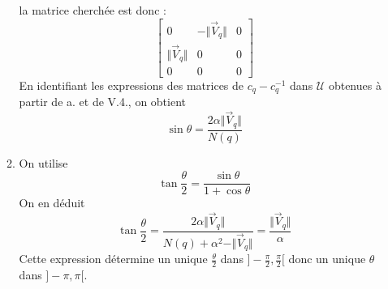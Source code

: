 \begin{enumerate}
\begin{enumerate}
\begin{displaymath}
\end{displaymath}
la matrice cherchée est donc :
\begin{displaymath}
 \begin{bmatrix}
  0 &   - \Vert \overrightarrow V_q \Vert & 0 \\
\Vert \overrightarrow V_q \Vert & 0 & 0 \\
0 & 0 & 0
 \end{bmatrix}
\end{displaymath}
En identifiant les expressions des matrices de $c_q - c_q^{-1}$ dans $\mathcal U$ obtenues à partir de a. et de V.4., on obtient
\begin{displaymath}
 \sin \theta = \dfrac{2\alpha \Vert \overrightarrow V_q \Vert}{N(q)}
\end{displaymath}
\item On utilise
\begin{displaymath}
 \tan \frac{\theta}{2} = \dfrac{\sin \theta}{1 + \cos \theta}
\end{displaymath}
On en déduit
\begin{displaymath}
  \tan \frac{\theta}{2} = \dfrac{2\alpha \Vert \overrightarrow V_q \Vert}{N(q)+\alpha^2-\Vert \overrightarrow V_q \Vert} 
= \dfrac{\Vert \overrightarrow V_q \Vert}{\alpha}
\end{displaymath}
Cette expression détermine un unique $\frac{\theta}{2}$ dans $]-\frac{\pi}{2},\frac{\pi}{2}[$ donc un unique $\theta$ dans $]-\pi, \pi[$.
\end{enumerate}
\end{enumerate}


